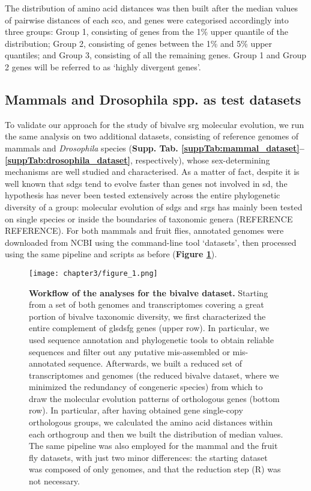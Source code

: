 \documentclass[../main.tex]{subfiles}
\begin{document}
The distribution of amino acid distances was then built after the median values of pairwise distances of each \gls{sco}, and genes were categorised accordingly into three groups: Group 1, consisting of genes from the 1\% upper quantile of the distribution; Group 2, consisting of genes between the 1\% and 5\% upper quantiles; and Group 3, consisting of all the remaining genes. Group 1 and Group 2 genes will be referred to as ‘highly divergent genes’.

\subsection{Mammals and Drosophila spp. as test datasets}
To validate our approach for the study of bivalve \gls{srg} molecular evolution, we run the same analysis on two additional datasets, consisting of reference genomes of mammals and \textit{Drosophila} species (\textbf{Supp. Tab. \ref{suppTab:mammal_dataset}--\ref{suppTab:drosophila_dataset}}, respectively), whose sex-determining mechanisms are well studied and characterised. As a matter of fact, despite it is well known that \glspl{sdg} tend to evolve faster than genes not involved in \gls{sd}, the hypothesis has never been tested extensively across the entire phylogenetic diversity of a group: molecular evolution of \glspl{sdg} and \glspl{srg} has mainly been tested on single species or inside the boundaries of taxonomic genera (REFERENCE REFERENCE). For both mammals and fruit flies, annotated genomes were downloaded from NCBI using the command-line tool ‘datasets’, then processed using the same pipeline and scripts as before (\textbf{Figure \ref{fig:workflow}}).

\begin{figure}[t]
	\centering
	\texttt{[image: chapter3/figure\_1.png]}
	\captionsetup{width=\textwidth}
	\caption{
		\textbf{Workflow of the analyses for the bivalve dataset.} Starting from a set of both genomes and transcriptomes covering a great portion of bivalve taxonomic diversity, we first characterized the entire complement of 	gls{dsfg} genes (upper row). In particular, we used sequence annotation and phylogenetic tools to obtain reliable sequences and filter out any putative mis-assembled or mis-annotated sequence. Afterwards, we built a reduced set of transcriptomes and genomes (the reduced bivalve dataset, where we minimized the redundancy of congeneric species) from which to draw the molecular evolution patterns of orthologous genes (bottom row). In particular, after having obtained gene single-copy orthologous groups, we calculated the amino acid distances within each orthogroup and then we built the distribution of median values. The same pipeline was also employed for the mammal and the fruit fly datasets, with just two minor differences: the starting dataset was composed of only genomes, and that the reduction step (R) was not necessary.
	}
	\label{fig:workflow}
\end{figure}
\end{document}
